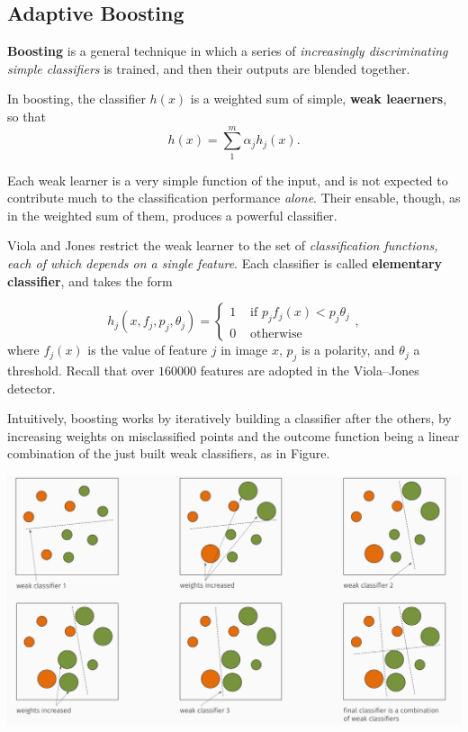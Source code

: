 \documentclass[10pt]{report}
\begin{document}
\subsection{Adaptive Boosting}
\label{sec:org6ccc5df}
\textbf{Boosting} is a general technique in which a series of \emph{increasingly discriminating simple classifiers} is trained, and then their outputs are blended together.

In boosting, the classifier \(h(x)\) is a weighted sum of simple, \textbf{weak leaerners}, so that $$h(x) = \sum_1^m \alpha_j h_j(x).$$

Each weak learner is a very simple function of the input, and is not expected to contribute much to the classification performance \emph{alone}. Their ensable, though, as in the weighted sum of them, produces a powerful classifier.

Viola and Jones restrict the weak learner to the set of \emph{classification functions, each of which depends on a single feature}. Each classifier is called \textbf{elementary classifier}, and takes the form

$$h_j(x, f_j, p_j, \theta_j) = \left\{\begin{array}{ll} 1 & \mbox{ if } p_j f_j(x) < p_j\theta_j \\ 0 & \mbox{ otherwise } \end{array}\right. ,$$
where \(f_j(x)\) is the value of feature \(j\) in image \(x\), \(p_j\) is a polarity, and \(\theta_j\) a threshold. Recall that over \(160000\) features are adopted in the Viola\---Jones detector.

Intuitively, boosting works by iteratively building a classifier after the others, by increasing weights on misclassified points and the outcome function being a linear combination of the just built weak classifiers, as in Figure.

\begin{center}
\includegraphics[width=.9\linewidth]{./pics/recog/boosting.jpg}
\end{center}
\end{document}
